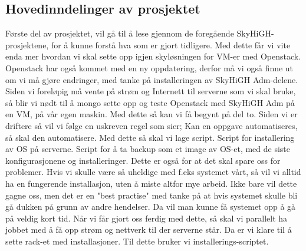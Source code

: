 \documentclass[12pt,a4paper]{article}
\begin{document}
\subsection{Hovedinndelinger av prosjektet}
Første del av prosjektet, vil gå til å lese gjennom de foregående SkyHiGH-prosjektene, for å kunne forstå hva som er 
gjort tidligere. Med dette får vi vite enda mer hvordan vi skal sette opp igjen skyløsningen for VM-er med Openstack.
Openstack har også kommet med en ny oppdatering, derfor må vi også finne ut om vi må gjøre endringer, med tanke på installeringen 
av SkyHiGH Adm-delene. Siden vi foreløpig må vente på strøm og Internett til serverne som vi skal bruke, så blir vi nødt til å mongo
sette opp og teste Openstack med SkyHiGH Adm på en VM, på vår egen maskin. \newline \newline
Med dette så kan vi få begynt på del to. Siden vi er driftere så vil vi følge en uskreven regel som sier; Kan en oppgave automatiseres, så skal den automatisere.
Med dette så skal vi lage script. Script for installering av OS på serverne. Script for å ta backup som et image av OS-et, med de siste konfigurasjonene og installeringer.
Dette er også for at det skal spare oss for problemer. Hvis vi skulle være så uheldige med f.eks systemet vårt, så vil vi alltid ha en fungerende installasjon, uten å miste
altfor mye arbeid. Ikke bare vil dette gagne oss, men det er en "best practise" med tanke på at hvis systemet skulle bli gå dukken på grunn av andre hendelser. Da vil 
man kunne få systemet opp å gå på veldig kort tid. \newline \newline
Når vi får gjort oss ferdig med dette, så skal vi parallelt ha jobbet med å få opp strøm og nettverk til der serverne står. Da er vi klare
til å sette rack-et med installasjoner. Til dette bruker vi installerings-scriptet. 
\end{document}
